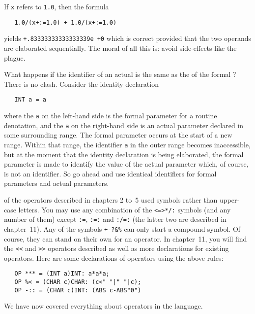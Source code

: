 If \verb|x| refers to \verb|1.0|, then the formula
\begin{verbatim}
   1.0/(x+:=1.0) + 1.0/(x+:=1.0)
\end{verbatim}
\noindent
yields \verb|+.83333333333333339e +0| which is correct provided that
the two operands are elaborated sequentially. The moral of all this
is: avoid side-effects like the plague.

What happens if the identifier of an actual
 is the same as the 
of the formal ? There is no clash.
Consider the identity declaration
\begin{verbatim}
   INT a = a
\end{verbatim}
\noindent
where the \verb|a| on the left-hand side is the formal parameter for
a routine denotation, and the \verb|a| on the right-hand side is an
actual parameter declared in some surrounding range. The formal
parameter occurs at the start of a new range. Within that range, the
identifier \verb|a| in the outer range becomes inaccessible, but at
the moment that the identity declaration is being elaborated, the
formal parameter is made to identify the value of the actual
parameter which, of course, is not an identifier. So go ahead and use
identical identifiers for formal parameters and actual parameters.

 of the operators described in chapters
2 to~5 used symbols rather than upper-case letters.  You may use any
combination of the \verb|<=>*/:| symbols (and any number of them)
except \verb|:=|, \verb|:=:| and \verb|:/=:| (the latter two are
described in chapter~11).  Any of the symbols \verb|+-?&%| can only
start a compound symbol. Of course, they can stand on their own for
an operator. In chapter~11, you will find the \verb|<<| and \verb|>>|
operators described as well as more declarations for existing
operators.  Here are some declarations of operators using the above
rules:
\begin{verbatim}
   OP *** = (INT a)INT: a*a*a;
   OP %< = (CHAR c)CHAR: (c<" "|" "|c);
   OP -:: = (CHAR c)INT: (ABS c-ABS"0")
\end{verbatim}

We have now covered everything about operators in the language.


